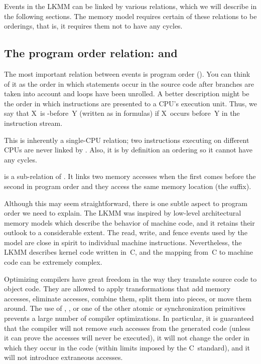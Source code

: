 Events in the LKMM can be linked by various relations, which we will
describe in the following sections.
The memory model requires certain of these relations to be orderings,
that is, it requires them not to have any cycles.


\subsection{The program order relation:  and }
\label{sec:docs:explanation:The Program Order Relation: po and po-loc}

The most important relation between events is program order ().
You can think of it as the order in which statements occur in the source
code after branches are taken into account and loops have been
unrolled.
A better description might be the order in which instructions are
presented to a CPU's execution unit.
Thus, we say that X~is -before~Y (written as  in
formulas) if X~occurs before~Y in the instruction stream.

This is inherently a single-CPU relation; two instructions executing
on different CPUs are never linked by .
Also, it is by definition an ordering so it cannot have any cycles.

 is a sub-relation of .
It links two memory accesses when the first comes before the second
in program order and they access the same memory location (the 
suffix).

Although this may seem straightforward, there is one subtle aspect to
program order we need to explain.
The LKMM was inspired by low-level architectural memory models which
describe the behavior of machine code, and it retains their outlook
to a considerable extent.
The read, write, and fence events used by the model are close in spirit
to individual machine instructions.
Nevertheless, the LKMM describes kernel code written in~C, and the
mapping from~C to machine code can be extremely complex.

Optimizing compilers have great freedom in the way they translate
source code to object code.
They are allowed to apply transformations that add memory accesses,
eliminate accesses, combine them, split them into pieces, or move them
around.
The use of , , or one of the other
atomic or synchronization primitives prevents a large number of
compiler optimizations.
In particular, it is guaranteed that the compiler will not remove such
accesses from the generated code (unless it can prove the accesses will
never be executed), it will not change the order in which they occur
in the code (within limits imposed by the C~standard), and it will not
introduce extraneous accesses.

